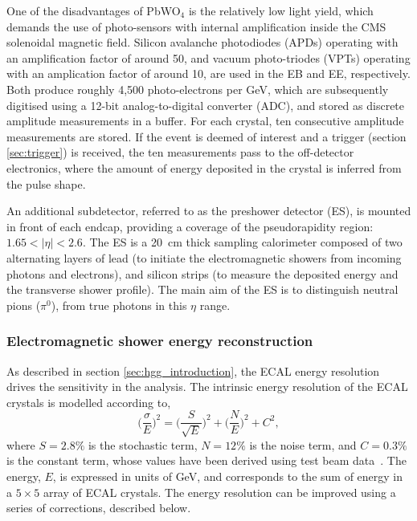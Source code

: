 One of the disadvantages of PbWO$_4$ is the relatively low light yield, which demands the use of photo-sensors with internal amplification inside the CMS solenoidal magnetic field. Silicon avalanche photodiodes (APDs) operating with an amplification factor of around 50, and vacuum photo-triodes (VPTs) operating with an amplication factor of around 10, are used in the EB and EE, respectively. Both produce roughly 4,500 photo-electrons per GeV, which are subsequently digitised using a 12-bit analog-to-digital converter (ADC), and stored as discrete amplitude measurements in a buffer. For each crystal, ten consecutive amplitude measurements are stored. If the event is deemed of interest and a trigger (section \ref{sec:trigger}) is received, the ten measurements pass to the off-detector electronics, where the amount of energy deposited in the crystal is inferred from the pulse shape.

An additional subdetector, referred to as the preshower detector (ES), is mounted in front of each endcap, providing a coverage of the pseudorapidity region: $1.65<|\eta|<2.6$. The ES is a 20~cm thick sampling calorimeter composed of two alternating layers of lead (to initiate the electromagnetic showers from incoming photons and electrons), and silicon strips (to measure the deposited energy and the transverse shower profile). The main aim of the ES is to distinguish neutral pions ($\pi^0$), from true photons in this $\eta$ range. 

\subsubsection{Electromagnetic shower energy reconstruction}
As described in section \ref{sec:hgg_introduction}, the ECAL energy resolution drives the sensitivity in the \Hgg analysis. The intrinsic energy resolution of the ECAL crystals is modelled according to,
\begin{equation}
    \Big(\frac{\sigma}{E}\Big)^2 =  \Big(\frac{S}{\sqrt{E}}\Big)^2 + \Big(\frac{N}{E}\Big)^2 + C^2,
\end{equation}
\noindent
where $S=2.8\%$ is the stochastic term, $N=12\%$ is the noise term, and $C=0.3\%$ is the constant term, whose values have been derived using test beam data~\cite{Chatrchyan:2008zzk}. The energy, $E$, is expressed in units of GeV, and corresponds to the sum of energy in a $5\times5$ array of ECAL crystals. The energy resolution can be improved using a series of corrections, described below.

